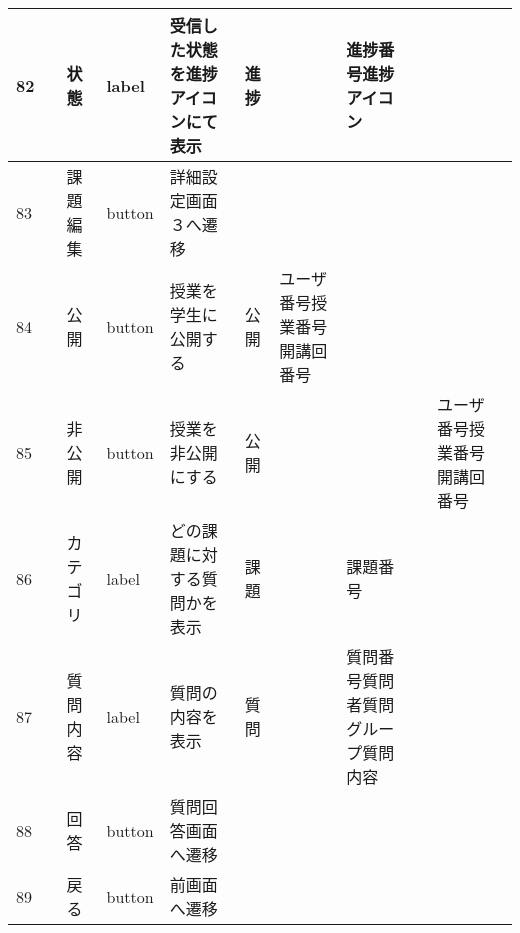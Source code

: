 \begin{table}[]
\begin{tabular}{|l|l|l|l|l|l|l|l|l|l|l|}
82  &               & 状態               & label    & 受信した状態を進捗アイコンにて表示                                                 & 進捗      &                       & 進捗番号進捗アイコン         &                 &                               &                                                                \\ \hline
83  &               & 課題編集             & button   & 詳細設定画面３へ遷移                                                        &         &                       &                    &                 &                               &                                                                \\ \hline
84  &               & 公開               & button   & 授業を学生に公開する                                                        & 公開      & ユーザ番号授業番号開講回番号        &                    &                 &                               &                                                                \\ \hline
85  &               & 非公開              & button   & 授業を非公開にする                                                         & 公開      &                       &                    &                 & ユーザ番号授業番号開講回番号                &                                                                \\ \hline
86  &               & カテゴリ             & label    & どの課題に対する質問かを表示                                                    & 課題      &                       & 課題番号               &                 &                               &                                                                \\ \hline
87  &               & 質問内容             & label    & 質問の内容を表示                                                          & 質問      &                       & 質問番号質問者質問グループ質問内容  &                 &                               &                                                                \\ \hline
88  &               & 回答               & button   & 質問回答画面へ遷移                                                         &         &                       &                    &                 &                               &                                                                \\ \hline
89  &               & 戻る               & button   & 前画面へ遷移                                                            &         &                       &                    &                 &                               &                                                                \\ \hline
\end{tabular}
\end{table}

